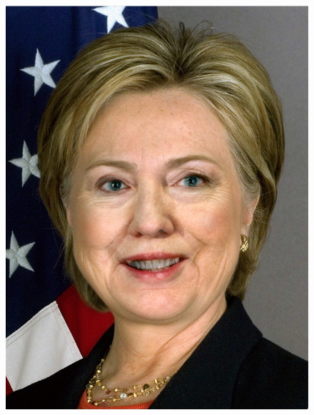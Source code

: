 \documentclass[a4paper]{article}
\begin{document}
\begin{figure}[htp]
{\begin{minipage}[b]{0.31\columnwidth}
{\includegraphics[width=1\columnwidth]{FHT.png} 
}
\label{fig:3-5:b}
\end{minipage}
}
\hfil
{}
\end{figure}
\end{document}
